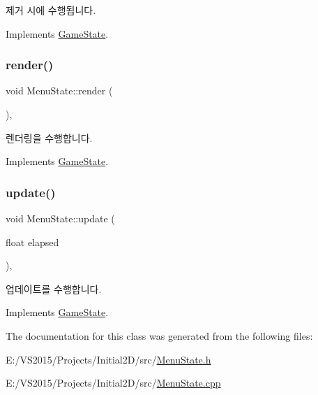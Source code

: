 제거 시에 수행됩니다. 

Implements \mbox{\hyperlink{class_game_state_a17db45d86c52f063cfc854f8ba062178}{Game\+State}}.

\mbox{\label{class_menu_state_ac216e0b4c7f5c5d39520165c45af0da6}} 
\subsubsection{\texorpdfstring{render()}{render()}}
{\footnotesize\ttfamily void Menu\+State\+::render (\begin{DoxyParamCaption}{ }\end{DoxyParamCaption})\hspace{0.3cm}{\ttfamily [override]}, {\ttfamily [virtual]}}

렌더링을 수행합니다. 

Implements \mbox{\hyperlink{class_game_state_ade2f8ae5aa83f8709863437a8ffba12c}{Game\+State}}.

\mbox{\label{class_menu_state_ace168c6eaa32fd90e1e09828f46bcfbf}} 
\subsubsection{\texorpdfstring{update()}{update()}}
{\footnotesize\ttfamily void Menu\+State\+::update (\begin{DoxyParamCaption}\item[{float}]{elapsed }\end{DoxyParamCaption})\hspace{0.3cm}{\ttfamily [override]}, {\ttfamily [virtual]}}

업데이트를 수행합니다. 

Implements \mbox{\hyperlink{class_game_state_acdace458d1c5a39fdb3bca0d65f88d7d}{Game\+State}}.



The documentation for this class was generated from the following files\+:\begin{DoxyCompactItemize}
\item 
E\+:/\+V\+S2015/\+Projects/\+Initial2\+D/src/\mbox{\hyperlink{_menu_state_8h}{Menu\+State.\+h}}\item 
E\+:/\+V\+S2015/\+Projects/\+Initial2\+D/src/\mbox{\hyperlink{_menu_state_8cpp}{Menu\+State.\+cpp}}\end{DoxyCompactItemize}
